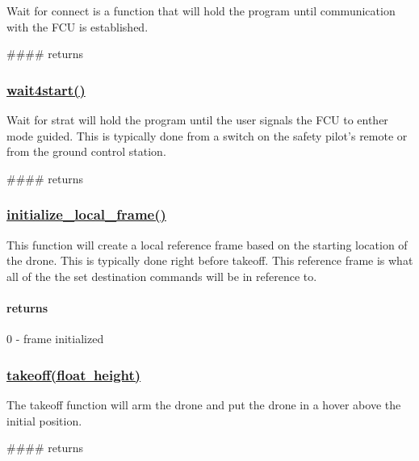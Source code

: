 Wait for connect is a function that will hold the program until communication with the F\+CU is established.

\#\#\#\# returns 
\begin{DoxyCode}{0}
\end{DoxyCode}
 \subsubsection*{\mbox{\hyperlink{group__control__functions_gab6fe46f505ab9804b4ed98b96286a811}{wait4start()}}}

Wait for strat will hold the program until the user signals the F\+CU to enther mode guided. This is typically done from a switch on the safety pilot’s remote or from the ground control station.

\#\#\#\# returns 
\begin{DoxyCode}{0}
\end{DoxyCode}
 \subsubsection*{\mbox{\hyperlink{group__control__functions_ga2a1100bb15673a9322c5be3bb8e9999f}{initialize\+\_\+local\+\_\+frame()}}}

This function will create a local reference frame based on the starting location of the drone. This is typically done right before takeoff. This reference frame is what all of the the set destination commands will be in reference to.

\paragraph*{returns}

0 -\/ frame initialized

\subsubsection*{\mbox{\hyperlink{group__control__functions_gac0aa671c99c09687515ec5bb8891c7d2}{takeoff(float height)}}}

The takeoff function will arm the drone and put the drone in a hover above the initial position.

\#\#\#\# returns 
\begin{DoxyCode}{0}
\end{DoxyCode}
